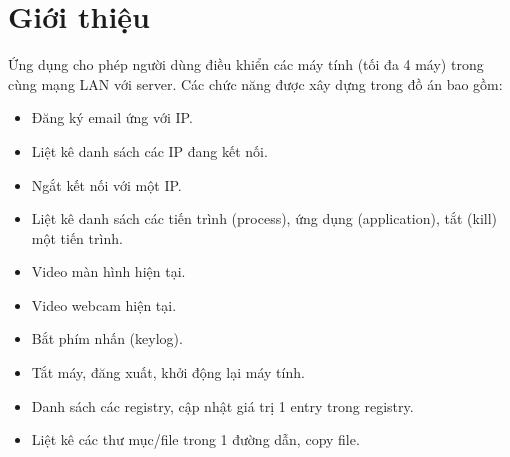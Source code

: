 \section{Giới thiệu}
Ứng dụng cho phép người dùng điều khiển các máy tính (tối đa 4 máy) trong cùng mạng LAN với server. Các chức năng được xây dựng trong đồ án bao gồm:
\begin{itemize}
\item Đăng ký email ứng với IP.
\item Liệt kê danh sách các IP đang kết nối.
\item Ngắt kết nối với một IP.
\item Liệt kê danh sách các tiến trình (process), ứng dụng (application), tắt (kill) một tiến trình.
\item Video màn hình hiện tại.
\item Video webcam hiện tại.
\item Bắt phím nhấn (keylog).
\item Tắt máy, đăng xuất, khởi động lại máy tính.
\item Danh sách các registry, cập nhật giá trị 1 entry trong registry.
\item Liệt kê các thư mục/file trong 1 đường dẫn, copy file.
\end{itemize}